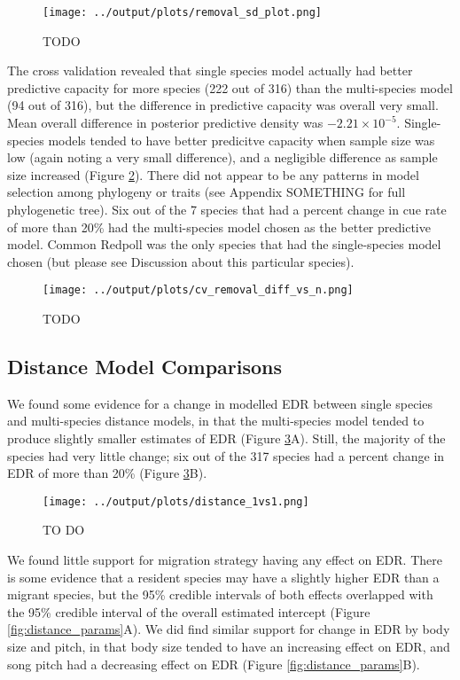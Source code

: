 \documentclass[12pt]{article}
\begin{document}
\begin{figure}[h!]
	\texttt{[image: ../output/plots/removal\_sd\_plot.png]}
	\caption{TODO}
	\label{fig:removal_sd}
\end{figure}

\par The cross validation revealed that single species model actually had better predictive capacity for more species (222 out of 316) than the multi-species model (94 out of 316), but the difference in predictive capacity was overall very small.
Mean overall difference in posterior predictive density was $-2.21 \times 10^{-5}$.
Single-species models tended to have better predicitve capacity when sample size was low (again noting a very small difference), and a negligible difference as sample size increased (Figure \ref{fig:removal_cv}).
There did not appear to be any patterns in model selection among phylogeny or traits (see Appendix SOMETHING for full phylogenetic tree).
Six out of the 7 species that had a percent change in cue rate of more than 20\% had the multi-species model chosen as the better predictive model.
Common Redpoll was the only species that had the single-species model chosen (but please see Discussion about this particular species).

\begin{figure}[h!]
	\texttt{[image: ../output/plots/cv\_removal\_diff\_vs\_n.png]}
	\caption{TODO}
	\label{fig:removal_cv}
\end{figure}

\subsection{Distance Model Comparisons}

\par We found some evidence for a change in modelled EDR between single species and multi-species distance models, in that the multi-species model tended to produce slightly smaller estimates of EDR (Figure \ref{fig:distance_1vs1}A). 
Still, the majority of the species had very little change; six out of the 317 species had a percent change in EDR of more than 20\% (Figure \ref{fig:distance_1vs1}B).

\begin{figure}[h!]
	\texttt{[image: ../output/plots/distance\_1vs1.png]}
	\caption{TO DO}
	\label{fig:distance_1vs1}
\end{figure}

\par We found little support for migration strategy having any effect on EDR.
There is some evidence that a resident species may have a slightly higher EDR than a migrant species, but the 95\% credible intervals of both effects overlapped with the 95\% credible interval of the overall estimated intercept (Figure \ref{fig:distance_params}A).
We did find similar support for change in EDR by body size and pitch, in that body size tended to have an increasing effect on EDR, and song pitch had a decreasing effect on EDR (Figure \ref{fig:distance_params}B).
\end{document}
